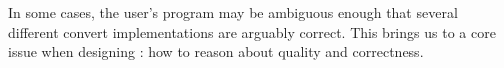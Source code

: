 In some cases, the user's program
may be ambiguous enough that several different convert implementations are arguably correct. This brings us to a core issue when designing \system: how to reason about quality and correctness.






